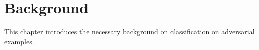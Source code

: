 \chapter{Background}
\label{chap:background}
This chapter introduces the necessary  background on classification on adversarial examples.
\minitoc



